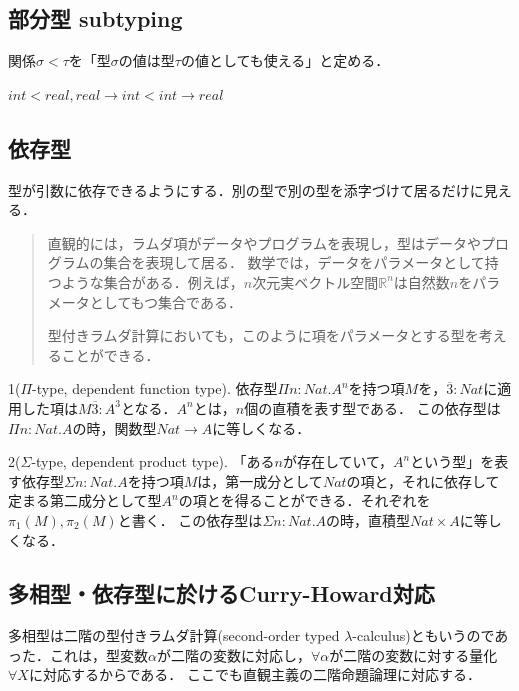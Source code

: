 \documentclass[uplatex, dvipdfmx]{jsreport}
\begin{document}
\subsection{部分型 subtyping}

関係$\sigma<\tau$を「型$\sigma$の値は型$\tau$の値としても使える」と定める．
\begin{example}
    $int<real, real\to int<int\to real$
\end{example}

\subsection{依存型}
型が引数に依存できるようにする．別の型で別の型を添字づけて居るだけに見える．
\begin{quotation}
    直観的には，ラムダ項がデータやプログラムを表現し，型はデータやプログラムの集合を表現して居る．
    数学では，データをパラメータとして持つような集合がある．例えば，$n$次元実ベクトル空間$\mathbb{R}^n$は自然数$n$をパラメータとしてもつ集合である．

    型付きラムダ計算においても，このように項をパラメータとする型を考えることができる．\cite{論理と計算のしくみ}
\end{quotation}

\begin{example}
    1($\Pi$-type, dependent function type). 依存型$\Pi n:Nat.A^n$を持つ項$M$を，$\overline{3}:Nat$に適用した項は$M\overline{3}:A^3$となる．$A^n$とは，$n$個の直積を表す型である．
    この依存型は$\Pi n:Nat.A$の時，関数型$Nat\to A$に等しくなる．

    2($\Sigma$-type, dependent product type). 「ある$n$が存在していて，$A^n$という型」を表す依存型$\Sigma n:Nat.A$を持つ項$M$は，第一成分として$Nat$の項と，それに依存して定まる第二成分として型$A^n$の項とを得ることができる．それぞれを$\pi_1(M),\pi_2(M)$と書く．
    この依存型は$\Sigma n:Nat.A$の時，直積型$Nat\times A$に等しくなる．
\end{example}

\subsection{多相型・依存型に於けるCurry-Howard対応}
多相型は二階の型付きラムダ計算(second-order typed $\lambda$-calculus)ともいうのであった．これは，型変数$\alpha$が二階の変数に対応し，$\forall\alpha$が二階の変数に対する量化$\forall X$に対応するからである．
ここでも直観主義の二階命題論理に対応する．
\end{document}
